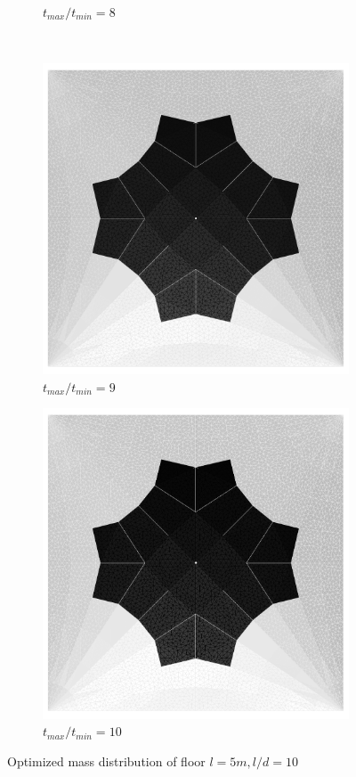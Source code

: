 \begin{figure}[H]
\begin{subfigure}[b]{.32\textwidth}
  \caption{$t_{max}/t_{min}=8$}
\end{subfigure}
~
\begin{subfigure}[b]{.32\textwidth}
  \centering
  \includegraphics[width=.99\linewidth]{images/t_opt_l2d10_gamma9}
  \caption{$t_{max}/t_{min}=9$}
\end{subfigure}

\begin{subfigure}[b]{.32\textwidth}
  \centering
  \includegraphics[width=.99\linewidth]{images/t_opt_l2d10_gamma10}
  \caption{$t_{max}/t_{min}=10$}
\end{subfigure}

\caption{Optimized mass distribution of floor $l=5m,l/d=10$}
\label{fig:opt_floor_l2d10}
\end{figure}


